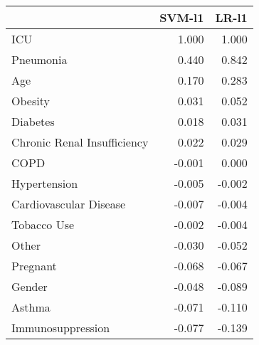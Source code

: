 \begin{tabular}{lrr}
\toprule
{} &  SVM-l1 &  LR-l1 \\
\midrule
ICU                         &   1.000 &  1.000 \\
Pneumonia                   &   0.440 &  0.842 \\
Age                         &   0.170 &  0.283 \\
Obesity                     &   0.031 &  0.052 \\
Diabetes                    &   0.018 &  0.031 \\
Chronic Renal Insufficiency &   0.022 &  0.029 \\
COPD                        &  -0.001 &  0.000 \\
Hypertension                &  -0.005 & -0.002 \\
Cardiovascular Disease      &  -0.007 & -0.004 \\
Tobacco Use                 &  -0.002 & -0.004 \\
Other                       &  -0.030 & -0.052 \\
Pregnant                    &  -0.068 & -0.067 \\
Gender                      &  -0.048 & -0.089 \\
Asthma                      &  -0.071 & -0.110 \\
Immunosuppression           &  -0.077 & -0.139 \\
\bottomrule
\end{tabular}
